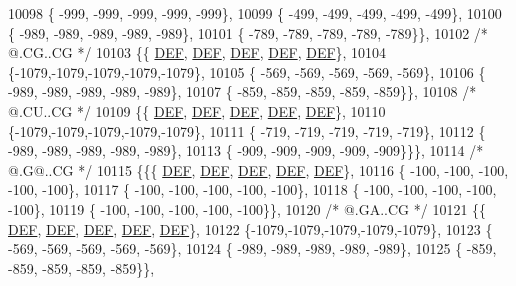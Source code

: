 \begin{DoxyCode}
10098 \{ -999, -999, -999, -999, -999\},
10099 \{ -499, -499, -499, -499, -499\},
10100 \{ -989, -989, -989, -989, -989\},
10101 \{ -789, -789, -789, -789, -789\}\},
10102 \textcolor{comment}{/*  @.CG..CG */}
10103 \{\{  \mbox{\hyperlink{1_88_84__epars_8h_a397419fc12b37ed479c8abb9d444d843}{DEF}},  \mbox{\hyperlink{1_88_84__epars_8h_a397419fc12b37ed479c8abb9d444d843}{DEF}},  \mbox{\hyperlink{1_88_84__epars_8h_a397419fc12b37ed479c8abb9d444d843}{DEF}},  \mbox{\hyperlink{1_88_84__epars_8h_a397419fc12b37ed479c8abb9d444d843}{DEF}},  \mbox{\hyperlink{1_88_84__epars_8h_a397419fc12b37ed479c8abb9d444d843}{DEF}}\},
10104 \{-1079,-1079,-1079,-1079,-1079\},
10105 \{ -569, -569, -569, -569, -569\},
10106 \{ -989, -989, -989, -989, -989\},
10107 \{ -859, -859, -859, -859, -859\}\},
10108 \textcolor{comment}{/*  @.CU..CG */}
10109 \{\{  \mbox{\hyperlink{1_88_84__epars_8h_a397419fc12b37ed479c8abb9d444d843}{DEF}},  \mbox{\hyperlink{1_88_84__epars_8h_a397419fc12b37ed479c8abb9d444d843}{DEF}},  \mbox{\hyperlink{1_88_84__epars_8h_a397419fc12b37ed479c8abb9d444d843}{DEF}},  \mbox{\hyperlink{1_88_84__epars_8h_a397419fc12b37ed479c8abb9d444d843}{DEF}},  \mbox{\hyperlink{1_88_84__epars_8h_a397419fc12b37ed479c8abb9d444d843}{DEF}}\},
10110 \{-1079,-1079,-1079,-1079,-1079\},
10111 \{ -719, -719, -719, -719, -719\},
10112 \{ -989, -989, -989, -989, -989\},
10113 \{ -909, -909, -909, -909, -909\}\}\},
10114 \textcolor{comment}{/*  @.G@..CG */}
10115 \{\{\{  \mbox{\hyperlink{1_88_84__epars_8h_a397419fc12b37ed479c8abb9d444d843}{DEF}},  \mbox{\hyperlink{1_88_84__epars_8h_a397419fc12b37ed479c8abb9d444d843}{DEF}},  \mbox{\hyperlink{1_88_84__epars_8h_a397419fc12b37ed479c8abb9d444d843}{DEF}},  \mbox{\hyperlink{1_88_84__epars_8h_a397419fc12b37ed479c8abb9d444d843}{DEF}},  \mbox{\hyperlink{1_88_84__epars_8h_a397419fc12b37ed479c8abb9d444d843}{DEF}}\},
10116 \{ -100, -100, -100, -100, -100\},
10117 \{ -100, -100, -100, -100, -100\},
10118 \{ -100, -100, -100, -100, -100\},
10119 \{ -100, -100, -100, -100, -100\}\},
10120 \textcolor{comment}{/*  @.GA..CG */}
10121 \{\{  \mbox{\hyperlink{1_88_84__epars_8h_a397419fc12b37ed479c8abb9d444d843}{DEF}},  \mbox{\hyperlink{1_88_84__epars_8h_a397419fc12b37ed479c8abb9d444d843}{DEF}},  \mbox{\hyperlink{1_88_84__epars_8h_a397419fc12b37ed479c8abb9d444d843}{DEF}},  \mbox{\hyperlink{1_88_84__epars_8h_a397419fc12b37ed479c8abb9d444d843}{DEF}},  \mbox{\hyperlink{1_88_84__epars_8h_a397419fc12b37ed479c8abb9d444d843}{DEF}}\},
10122 \{-1079,-1079,-1079,-1079,-1079\},
10123 \{ -569, -569, -569, -569, -569\},
10124 \{ -989, -989, -989, -989, -989\},
10125 \{ -859, -859, -859, -859, -859\}\},

\end{DoxyCode}
